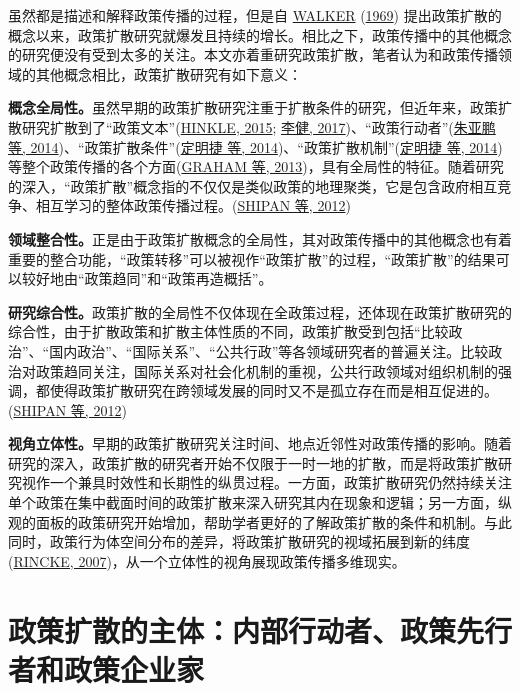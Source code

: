 \documentclass[
  12pt,
]{ctexart}
\begin{document}
虽然都是描述和解释政策传播的过程，但是自 \protect\hyperlink{ref-Walker1969}{WALKER} (\protect\hyperlink{ref-Walker1969}{1969}) 提出政策扩散的概念以来，政策扩散研究就爆发且持续的增长。相比之下，政策传播中的其他概念的研究便没有受到太多的关注。本文亦着重研究政策扩散，笔者认为和政策传播领域的其他概念相比，政策扩散研究有如下意义：

\textbf{概念全局性。}虽然早期的政策扩散研究注重于扩散条件的研究，但近年来，政策扩散研究扩散到了``政策文本''(\protect\hyperlink{ref-Hinkle2015}{HINKLE, 2015}; \protect\hyperlink{ref-LiJian2017}{李健, 2017})、``政策行动者''(\protect\hyperlink{ref-ZhuYaPengXiaoDiWen2014}{朱亚鹏 等, 2014})、``政策扩散条件''(\protect\hyperlink{ref-DingMingJieZhangLiang2014}{定明捷 等, 2014})、``政策扩散机制''(\protect\hyperlink{ref-DingMingJieZhangLiang2014}{定明捷 等, 2014})等整个政策传播的各个方面(\protect\hyperlink{ref-GrahamEtAl2013}{GRAHAM 等, 2013})，具有全局性的特征。随着研究的深入，``政策扩散''概念指的不仅仅是类似政策的地理聚类，它是包含政府相互竞争、相互学习的整体政策传播过程。(\protect\hyperlink{ref-ShipanVolden2012}{SHIPAN 等, 2012})

\textbf{领域整合性。}正是由于政策扩散概念的全局性，其对政策传播中的其他概念也有着重要的整合功能，``政策转移''可以被视作``政策扩散''的过程，``政策扩散''的结果可以较好地由``政策趋同''和``政策再造概括''。

\textbf{研究综合性。}政策扩散的全局性不仅体现在全政策过程，还体现在政策扩散研究的综合性，由于扩散政策和扩散主体性质的不同，政策扩散受到包括``比较政治''、``国内政治''、``国际关系''、``公共行政''等各领域研究者的普遍关注。比较政治对政策趋同关注，国际关系对社会化机制的重视，公共行政领域对组织机制的强调，都使得政策扩散研究在跨领域发展的同时又不是孤立存在而是相互促进的。(\protect\hyperlink{ref-ShipanVolden2012}{SHIPAN 等, 2012})

\textbf{视角立体性。}早期的政策扩散研究关注时间、地点近邻性对政策传播的影响。随着研究的深入，政策扩散的研究者开始不仅限于一时一地的扩散，而是将政策扩散研究视作一个兼具时效性和长期性的纵贯过程。一方面，政策扩散研究仍然持续关注单个政策在集中截面时间的政策扩散来深入研究其内在现象和逻辑；另一方面，纵观的面板的政策研究开始增加，帮助学者更好的了解政策扩散的条件和机制。与此同时，政策行为体空间分布的差异，将政策扩散研究的视域拓展到新的纬度(\protect\hyperlink{ref-Rincke2007}{RINCKE, 2007})，从一个立体性的视角展现政策传播多维现实。

\newpage

\hypertarget{ux653fux7b56ux6269ux6563ux7684ux4e3bux4f53ux5185ux90e8ux884cux52a8ux8005ux653fux7b56ux5148ux884cux8005ux548cux653fux7b56ux4f01ux4e1aux5bb6}{%
\section{政策扩散的主体：内部行动者、政策先行者和政策企业家}\label{ux653fux7b56ux6269ux6563ux7684ux4e3bux4f53ux5185ux90e8ux884cux52a8ux8005ux653fux7b56ux5148ux884cux8005ux548cux653fux7b56ux4f01ux4e1aux5bb6}}
\end{document}
